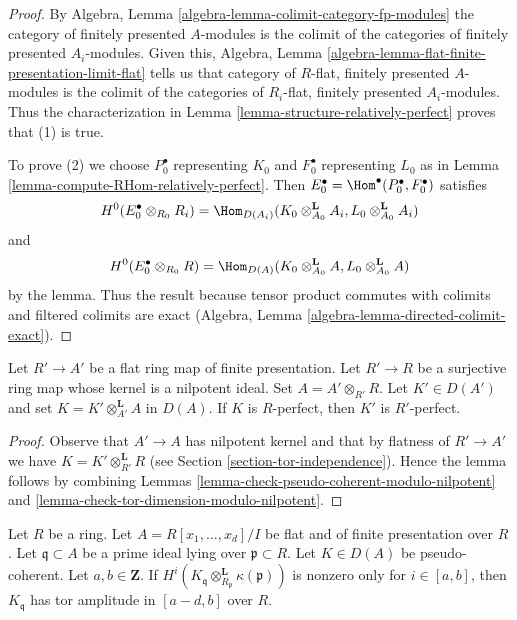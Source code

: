 \begin{proof}
By Algebra, Lemma \ref{algebra-lemma-colimit-category-fp-modules}
the category of finitely presented $A$-modules is the colimit of
the categories of finitely presented $A_i$-modules.
Given this, Algebra, Lemma
\ref{algebra-lemma-flat-finite-presentation-limit-flat}
tells us that category of $R$-flat, finitely presented $A$-modules
is the colimit of the categories of
$R_i$-flat, finitely presented $A_i$-modules.
Thus the characterization in
Lemma \ref{lemma-structure-relatively-perfect}
proves that (1) is true.

\medskip\noindent
To prove (2) we choose $P_0^\bullet$ representing $K_0$ and
$F_0^\bullet$ representing $L_0$ as in
Lemma \ref{lemma-compute-RHom-relatively-perfect}.
Then $E_0^\bullet = \Hom^\bullet(P_0^\bullet, F_0^\bullet)$
satisfies
$$
H^0(E_0^\bullet \otimes_{R_0} R_i) =
\Hom_{D(A_i)}(K_0 \otimes_{A_0}^\mathbf{L} A_i,
L_0 \otimes_{A_0}^\mathbf{L} A_i)
$$
and
$$
H^0(E_0^\bullet \otimes_{R_0} R) =
\Hom_{D(A)}(K_0 \otimes_{A_0}^\mathbf{L} A, L_0 \otimes_{A_0}^\mathbf{L} A)
$$
by the lemma. Thus the result because tensor product commutes
with colimits and filtered colimits are exact
(Algebra, Lemma \ref{algebra-lemma-directed-colimit-exact}).
\end{proof}

\begin{lemma}
\label{lemma-thickening-relatively-perfect}
Let $R' \to A'$ be a flat ring map of finite presentation.
Let $R' \to R$ be a surjective ring map whose kernel is a nilpotent ideal.
Set $A = A' \otimes_{R'} R$. Let $K' \in D(A')$ and set
$K = K' \otimes_{A'}^\mathbf{L} A$ in $D(A)$.
If $K$ is $R$-perfect, then $K'$ is $R'$-perfect.
\end{lemma}

\begin{proof}
Observe that $A' \to A$ has nilpotent kernel and that by flatness of
$R' \to A'$ we have $K = K' \otimes_{R'}^\mathbf{L} R$ (see
Section \ref{section-tor-independence}). Hence the lemma follows by combining
Lemmas \ref{lemma-check-pseudo-coherent-modulo-nilpotent} and
\ref{lemma-check-tor-dimension-modulo-nilpotent}.
\end{proof}

\begin{lemma}
\label{lemma-lift-from-fibre-relatively-perfect}
Let $R$ be a ring. Let $A = R[x_1, \ldots, x_d]/I$
be flat and of finite presentation over $R$.
Let $\mathfrak q \subset A$ be a prime ideal lying over
$\mathfrak p \subset R$. Let $K \in D(A)$ be pseudo-coherent.
Let $a, b \in \mathbf{Z}$. If
$H^i(K_\mathfrak q \otimes_{R_\mathfrak p}^\mathbf{L} \kappa(\mathfrak p))$
is nonzero only for $i \in [a, b]$, then
$K_\mathfrak q$ has tor amplitude in $[a - d, b]$ over $R$.
\end{lemma}


